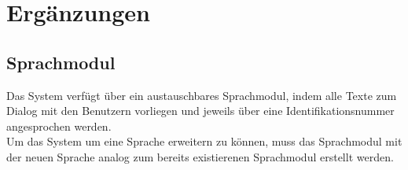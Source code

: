 \section{Ergänzungen}


\subsection{Sprachmodul}
Das System verfügt über ein austauschbares Sprachmodul,
indem alle Texte zum Dialog mit den Benutzern vorliegen und jeweils über eine Identifikationsnummer angesprochen werden.\\
Um das System um eine Sprache erweitern zu können,
muss das Sprachmodul mit der neuen Sprache analog zum bereits existierenen Sprachmodul erstellt werden.

